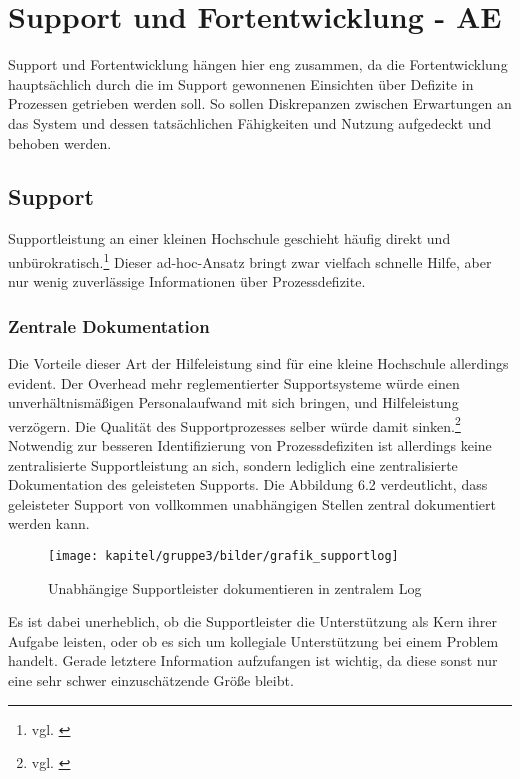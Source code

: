 \section{Support und Fortentwicklung - AE}
Support und Fortentwicklung hängen hier eng zusammen, da die Fortentwicklung hauptsächlich durch die im Support gewonnenen Einsichten über Defizite in Prozessen getrieben werden soll. So sollen Diskrepanzen zwischen Erwartungen an das System und dessen tatsächlichen Fähigkeiten und Nutzung aufgedeckt und behoben werden.

\subsection{Support}
Supportleistung an einer kleinen Hochschule geschieht häufig direkt und unbürokratisch.\footnote{vgl. \cite{gunter_muller_interview}} Dieser ad-hoc-Ansatz bringt zwar vielfach schnelle Hilfe, aber nur wenig zuverlässige Informationen über Prozessdefizite.

\subsubsection{Zentrale Dokumentation}
Die Vorteile dieser Art der Hilfeleistung sind für eine kleine Hochschule allerdings evident. Der Overhead mehr reglementierter Supportsysteme würde einen unverhältnismäßigen Personalaufwand mit sich bringen, und Hilfeleistung verzögern. Die Qualität des Supportprozesses selber würde damit sinken.\footnote{vgl. \cite{gunter_muller_interview}}
Notwendig zur besseren Identifizierung von Prozessdefiziten ist allerdings keine zentralisierte Supportleistung an sich, sondern lediglich eine zentralisierte Dokumentation des geleisteten Supports. Die Abbildung 6.2 verdeutlicht, dass geleisteter Support von vollkommen unabhängigen Stellen zentral dokumentiert werden kann.

\begin{figure}[h!]
	\centering
	\texttt{[image: kapitel/gruppe3/bilder/grafik\_supportlog]}
	\caption{Unabhängige Supportleister dokumentieren in zentralem Log}
	\label{fig_zentraler_supportlog}
\end{figure}

Es ist dabei unerheblich, ob die Supportleister die Unterstützung als Kern ihrer Aufgabe leisten, oder ob es sich um kollegiale Unterstützung bei einem Problem handelt. Gerade letztere Information aufzufangen ist wichtig, da diese sonst nur eine sehr schwer einzuschätzende Größe bleibt.

